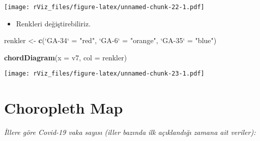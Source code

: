\documentclass[
]{book}
\newenvironment{Shaded}{\begin{snugshade}}{\end{snugshade}}
\newcommand{\DataTypeTok}[1]{\textcolor[rgb]{0.13,0.29,0.53}{#1}}
\newcommand{\KeywordTok}[1]{\textcolor[rgb]{0.13,0.29,0.53}{\textbf{#1}}}
\newcommand{\NormalTok}[1]{#1}
\newcommand{\StringTok}[1]{\textcolor[rgb]{0.31,0.60,0.02}{#1}}
\providecommand{\tightlist}{%
  \setlength{\itemsep}{0pt}\setlength{\parskip}{0pt}}
\begin{document}
\texttt{[image: rViz\_files/figure-latex/unnamed-chunk-22-1.pdf]}

\begin{itemize}
\tightlist
\item
  Renkleri değiştirebiliriz.
\end{itemize}

\begin{Shaded}
\begin{Highlighting}[]
\NormalTok{renkler <-}\StringTok{ }\KeywordTok{c}\NormalTok{(}\StringTok{`}\DataTypeTok{GA-34}\StringTok{`}\NormalTok{ =}\StringTok{ "red"}\NormalTok{, }\StringTok{`}\DataTypeTok{GA-6}\StringTok{`}\NormalTok{ =}\StringTok{ "orange"}\NormalTok{, }\StringTok{`}\DataTypeTok{GA-35}\StringTok{`}\NormalTok{ =}\StringTok{ "blue"}\NormalTok{)}

\KeywordTok{chordDiagram}\NormalTok{(}\DataTypeTok{x =}\NormalTok{ v7, }\DataTypeTok{col =}\NormalTok{ renkler)}
\end{Highlighting}
\end{Shaded}

\texttt{[image: rViz\_files/figure-latex/unnamed-chunk-23-1.pdf]}

\hypertarget{choropleth-map}{%
\section{Choropleth Map}\label{choropleth-map}}

\emph{İllere göre Covid-19 vaka sayısı (iller bazında ilk açıklandığı zamana ait veriler):}
\end{document}
